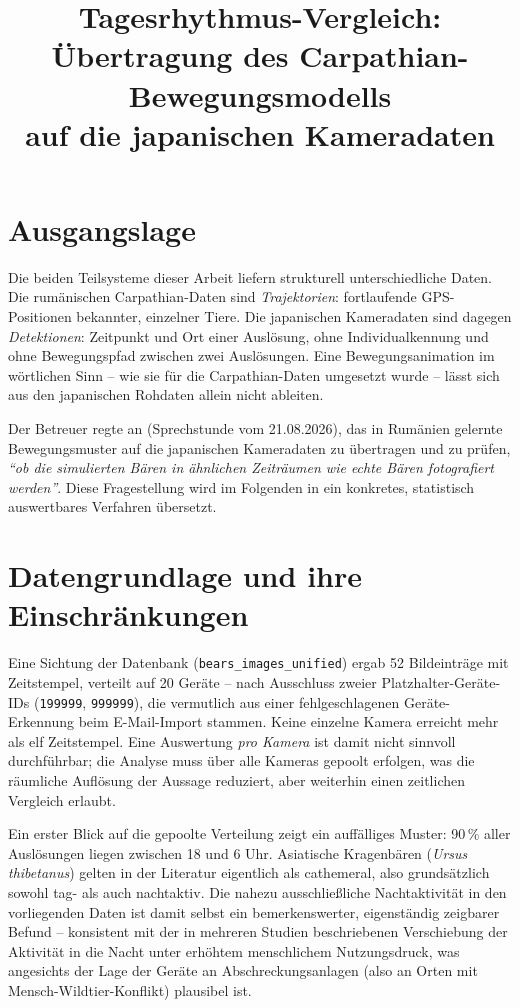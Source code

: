 \documentclass[11pt,a4paper]{article}
\title{Tagesrhythmus-Vergleich: Übertragung des Carpathian-Bewegungsmodells\\
auf die japanischen Kameradaten}
\author{}
\date{}
\begin{document}
\maketitle
\vspace{-2em}

\section{Ausgangslage}

Die beiden Teilsysteme dieser Arbeit liefern strukturell unterschiedliche
Daten. Die rum\"anischen Carpathian-Daten sind \emph{Trajektorien}: fortlaufende
GPS-Positionen bekannter, einzelner Tiere. Die japanischen Kameradaten sind
dagegen \emph{Detektionen}: Zeitpunkt und Ort einer Ausl\"osung, ohne
Individualkennung und ohne Bewegungspfad zwischen zwei Ausl\"osungen. Eine
Bewegungsanimation im wörtlichen Sinn -- wie sie f\"ur die Carpathian-Daten
umgesetzt wurde -- l\"asst sich aus den japanischen Rohdaten allein nicht
ableiten.

Der Betreuer regte an (Sprechstunde vom 21.08.2026), das in Rum\"anien
gelernte Bewegungsmuster auf die japanischen Kameradaten zu \"ubertragen und
zu pr\"ufen, \emph{"`ob die simulierten B\"aren in \"ahnlichen Zeitr\"aumen wie
echte B\"aren fotografiert werden"'}. Diese Fragestellung wird im Folgenden in
ein konkretes, statistisch auswertbares Verfahren \"ubersetzt.

\section{Datengrundlage und ihre Einschr\"ankungen}

Eine Sichtung der Datenbank (\texttt{bears\_images\_unified}) ergab 52
Bildeintr\"age mit Zeitstempel, verteilt auf 20 Ger\"ate -- nach Ausschluss
zweier Platzhalter-Ger\"ate-IDs (\texttt{199999}, \texttt{999999}), die
vermutlich aus einer fehlgeschlagenen Ger\"ate-Erkennung beim
E-Mail-Import stammen. Keine einzelne Kamera erreicht mehr als elf
Zeitstempel. Eine Auswertung \emph{pro Kamera} ist damit nicht sinnvoll
durchf\"uhrbar; die Analyse muss \"uber alle Kameras gepoolt erfolgen, was die
r\"aumliche Aufl\"osung der Aussage reduziert, aber weiterhin einen zeitlichen
Vergleich erlaubt.

Ein erster Blick auf die gepoolte Verteilung zeigt ein auff\"alliges Muster:
90\,\% aller Ausl\"osungen liegen zwischen 18 und 6 Uhr. Asiatische
Kragenb\"aren (\emph{Ursus thibetanus}) gelten in der Literatur eigentlich als
cathemeral, also grunds\"atzlich sowohl tag- als auch nachtaktiv. Die nahezu
ausschlie{\ss}liche Nachtaktivit\"at in den vorliegenden Daten ist damit selbst
ein bemerkenswerter, eigenst\"andig zeigbarer Befund -- konsistent mit der
in mehreren Studien beschriebenen Verschiebung der Aktivit\"at in die Nacht
unter erh\"ohtem menschlichem Nutzungsdruck, was angesichts der Lage der
Ger\"ate an Abschreckungsanlagen (also an Orten mit Mensch-Wildtier-Konflikt)
plausibel ist.
\end{document}
